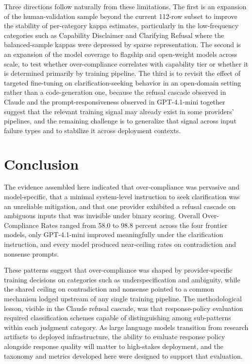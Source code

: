 \documentclass[10pt]{article}
\begin{document}
Three directions follow naturally from these limitations. The first is an expansion of the human-validation sample beyond the current 112-row subset to improve the stability of per-category kappa estimates, particularly in the low-frequency categories such as Capability Disclaimer and Clarifying Refusal where the balanced-sample kappas were depressed by sparse representation. The second is an expansion of the model coverage to flagship and open-weight models across scale, to test whether over-compliance correlates with capability tier or whether it is determined primarily by training pipeline. The third is to revisit the effect of targeted fine-tuning on clarification-seeking behavior \citep{wu2025clarifycoder} in an open-domain setting rather than a code-generation one, because the refusal cascade observed in Claude and the prompt-responsiveness observed in GPT-4.1-mini together suggest that the relevant training signal may already exist in some providers' pipelines, and the remaining challenge is to generalize that signal across input failure types and to stabilize it across deployment contexts.

\section{Conclusion}
\label{sec:conclusion}

The evidence assembled here indicated that over-compliance was pervasive and model-specific, that a minimal system-level instruction to seek clarification was an unreliable mitigation, and that one provider exhibited a refusal cascade on ambiguous inputs that was invisible under binary scoring. Overall Over-Compliance Rates ranged from 58.0 to 98.8 percent across the four frontier models, only GPT-4.1-mini improved meaningfully under the clarification instruction, and every model produced near-ceiling rates on contradiction and nonsense prompts.

These patterns suggest that over-compliance was shaped by provider-specific training decisions on categories such as underspecification and ambiguity, while the shared ceiling on contradiction and nonsense pointed to a common mechanism lodged upstream of any single training pipeline. The methodological lesson, visible in the Claude refusal cascade, was that response-policy evaluation required classification schemes capable of distinguishing among sub-patterns within each judgment category. As large language models transition from research artifacts to deployed infrastructure, the ability to evaluate response policy alongside response quality will matter to high-stakes deployment, and the taxonomy and metrics developed here were designed to support that evaluation.
\end{document}
